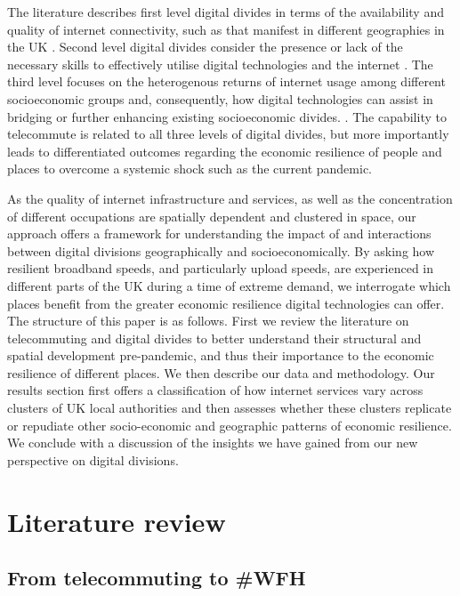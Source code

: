 \documentclass[Royal,times,sageh]{sagej}
\begin{document}
The literature describes first level digital divides in terms of the
availability and quality of internet connectivity, such as that manifest
in different geographies in the UK
\citep{riddlesden2014broadband, philip2017digital}. Second level digital
divides consider the presence or lack of the necessary skills to
effectively utilise digital technologies and the internet
\citep{blank2014dimensions, van2011internet}. The third level focuses on
the heterogenous returns of internet usage among different socioeconomic
groups and, consequently, how digital technologies can assist in
bridging or further enhancing existing socioeconomic divides.
\citep{stern2009levels, van2014digital, van2015third}. The capability to
telecommute is related to all three levels of digital divides, but more
importantly leads to differentiated outcomes regarding the economic
resilience of people and places to overcome a systemic shock such as the
current pandemic.

As the quality of internet infrastructure and services, as well as the
concentration of different occupations are spatially dependent and
clustered in space, our approach offers a framework for understanding
the impact of and interactions between digital divisions geographically
and socioeconomically. By asking how resilient broadband speeds, and
particularly upload speeds, are experienced in different parts of the UK
during a time of extreme demand, we interrogate which places benefit
from the greater economic resilience digital technologies can offer. The
structure of this paper is as follows. First we review the literature on
telecommuting and digital divides to better understand their structural
and spatial development pre-pandemic, and thus their importance to the
economic resilience of different places. We then describe our data and
methodology. Our results section first offers a classification of how
internet services vary across clusters of UK local authorities and then
assesses whether these clusters replicate or repudiate other
socio-economic and geographic patterns of economic resilience. We
conclude with a discussion of the insights we have gained from our new
perspective on digital divisions.

\hypertarget{sec:2}{%
\section{Literature review}\label{sec:2}}

\hypertarget{sec:2.1}{%
\subsection{From telecommuting to \#WFH}\label{sec:2.1}}
\end{document}
